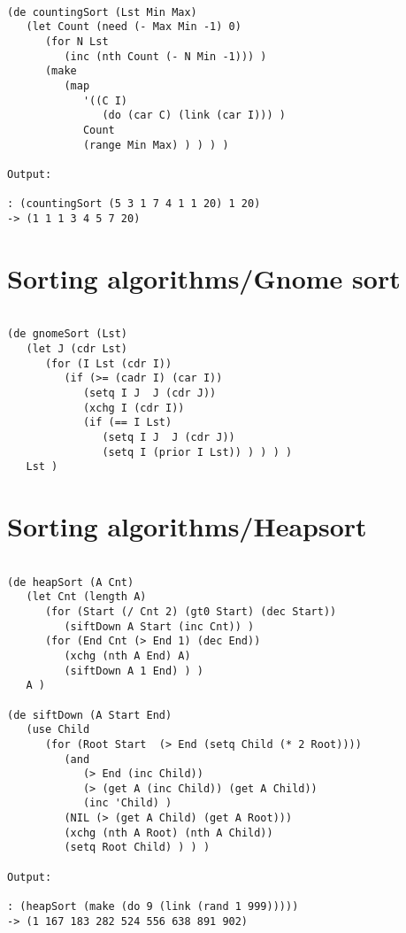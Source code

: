 \begin{verbatim}

(de countingSort (Lst Min Max)
   (let Count (need (- Max Min -1) 0)
      (for N Lst
         (inc (nth Count (- N Min -1))) )
      (make
         (map
            '((C I)
               (do (car C) (link (car I))) )
            Count
            (range Min Max) ) ) ) )

Output:

: (countingSort (5 3 1 7 4 1 1 20) 1 20)
-> (1 1 1 3 4 5 7 20)

\end{verbatim}

\section*{Sorting algorithms/Gnome sort}

\begin{verbatim}

(de gnomeSort (Lst)
   (let J (cdr Lst)
      (for (I Lst (cdr I))
         (if (>= (cadr I) (car I))
            (setq I J  J (cdr J))
            (xchg I (cdr I))
            (if (== I Lst)
               (setq I J  J (cdr J))
               (setq I (prior I Lst)) ) ) ) )
   Lst )

\end{verbatim}

\section*{Sorting algorithms/Heapsort}

\begin{verbatim}

(de heapSort (A Cnt)
   (let Cnt (length A)
      (for (Start (/ Cnt 2) (gt0 Start) (dec Start))
         (siftDown A Start (inc Cnt)) )
      (for (End Cnt (> End 1) (dec End))
         (xchg (nth A End) A)
         (siftDown A 1 End) ) )
   A )

(de siftDown (A Start End)
   (use Child
      (for (Root Start  (> End (setq Child (* 2 Root))))
         (and
            (> End (inc Child))
            (> (get A (inc Child)) (get A Child))
            (inc 'Child) )
         (NIL (> (get A Child) (get A Root)))
         (xchg (nth A Root) (nth A Child))
         (setq Root Child) ) ) )

Output:

: (heapSort (make (do 9 (link (rand 1 999)))))
-> (1 167 183 282 524 556 638 891 902)

\end{verbatim}

